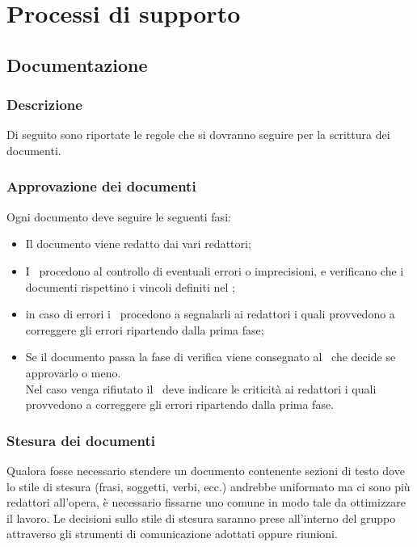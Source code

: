\documentclass[../NormeDiProgetto.tex]{subfiles}
\begin{document}
	\section{Processi di supporto}
		\subsection{Documentazione}
			\subsubsection{Descrizione}
				Di seguito sono riportate le regole che si dovranno seguire per la scrittura
				dei documenti.
			\subsubsection{Approvazione dei documenti}
				Ogni documento deve seguire le seguenti fasi:
				\begin{itemize}
					\item Il documento viene redatto dai vari redattori;
					\item I \verificatori\ procedono al controllo di eventuali errori o
					imprecisioni, e verificano che i documenti rispettino i vincoli definiti nel \pianodiqualificav;
					\item in caso di errori i \verificatori\ procedono a segnalarli ai redattori
					i quali provvedono a correggere gli errori ripartendo dalla prima fase;
					\item Se il documento passa la fase di verifica viene consegnato al
					\responsabilediprogetto\ che decide se approvarlo o meno.\\
					Nel caso venga rifiutato il \responsabilediprogetto\ deve indicare le
					criticità ai redattori i quali provvedono a correggere gli errori
					ripartendo dalla prima fase.
				\end{itemize}
			\subsubsection{Stesura dei documenti}
					Qualora fosse necessario stendere un documento contenente sezioni di testo dove lo stile
					di stesura (frasi, soggetti, verbi, ecc.) andrebbe uniformato ma ci sono più redattori
					all'opera, è necessario fissarne uno comune in modo tale da ottimizzare il lavoro.
					Le decisioni sullo stile di stesura saranno prese all'interno del gruppo attraverso
					gli strumenti di comunicazione adottati oppure riunioni.\\
\end{document}
